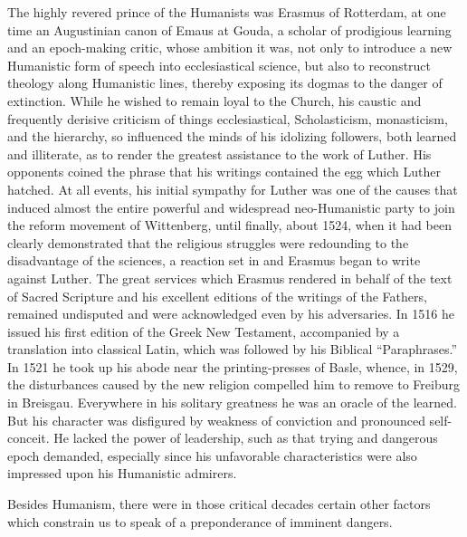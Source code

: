 The highly revered prince of the Humanists was Erasmus of
Rotterdam, at one time an Augustinian canon of Emaus at Gouda,
a scholar of prodigious learning and an epoch-making critic, whose
ambition it was, not only to introduce a new Humanistic form of
speech into ecclesiastical science, but also to reconstruct theology
along Humanistic lines, thereby exposing its dogmas to the danger
of extinction. While he wished to remain loyal to the Church, his
caustic and frequently derisive criticism of things ecclesiastical, Scholasticism,
monasticism, and the hierarchy, so influenced the minds
of his idolizing followers, both learned and illiterate, as to render
the greatest assistance to the work of Luther. His opponents coined
the phrase that his writings contained the egg which Luther hatched.
At all events, his initial sympathy for Luther was one of the causes
that induced almost the entire powerful and widespread neo-Humanistic
party to join the reform movement of Wittenberg, until
finally, about 1524, when it had been clearly demonstrated that the
religious struggles were redounding to the disadvantage of the sciences,
a reaction set in and Erasmus began to write against Luther.
The great services which Erasmus rendered in behalf of the text
of Sacred Scripture and his excellent editions of the writings of the
Fathers, remained undisputed and were acknowledged even by his
adversaries. In 1516 he issued his first edition of the Greek New
Testament, accompanied by a translation into classical Latin, which
was followed by his Biblical “Paraphrases.” In 1521 he took up his
abode near the printing-presses of Basle, whence, in 1529, the disturbances
caused by the new religion compelled him to remove to
Freiburg in Breisgau. Everywhere in his solitary greatness he was
an oracle of the learned. But his character was disfigured by weakness
of conviction and pronounced self-conceit. He lacked the power
of leadership, such as that trying and dangerous epoch demanded,
especially since his unfavorable characteristics were also impressed
upon his Humanistic admirers.

Besides Humanism, there were in those critical decades certain
other factors which constrain us to speak of a preponderance of
imminent dangers.

